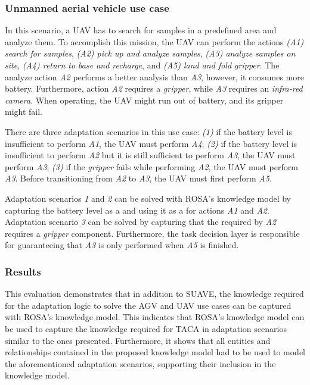 \subsubsection{Unmanned aerial vehicle use case~\citep{braberman2018extended}}\label{sec:morph_example}
In this scenario, a UAV has to search for samples in a predefined area and analyze them. To accomplish this mission, the UAV can perform the actions \emph{(A1) search for samples}, \emph{(A2) pick up and analyze samples}, \emph{(A3) analyze samples on site}, \emph{(A4) return to base and recharge}, and \emph{(A5) land and fold gripper}. The analyze action \emph{A2} performs a better analysis than \emph{A3}, however, it consumes more battery. Furthermore, action \emph{A2} requires a \emph{gripper}, while \emph{A3} requires an \emph{infra-red camera}. When operating, the UAV might run out of battery, and its gripper might fail.

There are three adaptation scenarios in this use case:
\emph{(1)} if the battery level is insufficient to perform \emph{A1}, the UAV must perform \emph{A4}; \emph{(2)} if the battery level is insufficient to perform \emph{A2} but it is still sufficient to perform \emph{A3}, the UAV must perform \emph{A3}; \emph{(3)} if the \emph{gripper} fails while performing \emph{A2}, the UAV must perform \emph{A3}.
Before transitioning from \emph{A2} to \emph{A3}, the UAV must first perform \emph{A5}.

Adaptation scenarios \emph{1} and \emph{2} can be solved with ROSA's knowledge model by capturing the battery level as a  and using it as a  for actions \emph{A1} and \emph{A2}. Adaptation scenario \emph{3} can be solved by capturing that the  required by \emph{A2} requires a \emph{gripper} component. Furthermore, the task decision layer is responsible for guaranteeing that \emph{A3} is only performed when \emph{A5} is finished.

\subsubsection{Results} This evaluation demonstrates that in addition to SUAVE, the knowledge required for the adaptation logic to solve the AGV and UAV use cases can be captured with ROSA's knowledge model. This indicates that ROSA's knowledge model can be used to capture the knowledge required for TACA in adaptation scenarios similar to the ones presented.
Furthermore, it shows that all entities and relationships contained in the proposed knowledge model had to be used to model the aforementioned adaptation scenarios, supporting their inclusion in the knowledge model.

